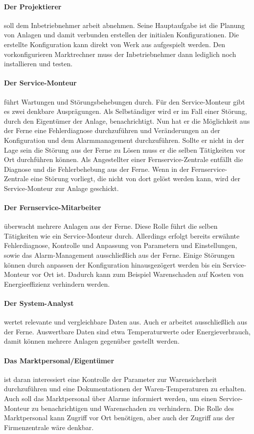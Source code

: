 \documentclass[11pt,a4paper]{report}
\begin{document}
\paragraph{Der Projektierer} soll dem Inbetriebnehmer arbeit abnehmen. Seine Hauptaufgabe ist die Planung von Anlagen und damit verbunden erstellen der initialen Konfigurationen. Die erstellte Konfiguration kann direkt von Werk aus aufgespielt werden. Den vorkonfigurieren Marktrechner muss der Inbetriebnehmer dann lediglich noch installieren und testen.
\paragraph{Der Service-Monteur} führt Wartungen und Störungsbehebungen durch. Für den Service-Monteur gibt es zwei denkbare Ausprägungen. Als Selbständiger wird er im Fall einer Störung, durch den Eigentümer der Anlage, benachrichtigt. Nun hat er die Möglichkeit aus der Ferne eine Fehlerdiagnose durchzuführen und Veränderungen an der Konfiguration und dem Alarmmanagement durchzuführen. Sollte er nicht in der Lage sein die Störung aus der Ferne zu Lösen muss er die selben Tätigkeiten vor Ort durchführen können. Als Angestellter einer Fernservice-Zentrale entfällt die Diagnose und die Fehlerbehebung aus der Ferne. Wenn in der Fernservice-Zentrale eine Störung vorliegt, die nicht von dort gelöst werden kann, wird der Service-Monteur zur Anlage geschickt.
\paragraph{Der Fernservice-Mitarbeiter} überwacht mehrere Anlagen aus der Ferne. Diese Rolle führt die selben Tätigkeiten wie ein Service-Monteur durch. Allerdings erfolgt bereits erwähnte Fehlerdiagnose, Kontrolle und Anpassung von Parametern und Einstellungen, sowie das Alarm-Management ausschließlich aus der Ferne. Einige Störungen können durch anpassen der Konfiguration hinausgezögert werden bis ein Service-Monteur vor Ort ist. Dadurch kann zum Beispiel Warenschaden auf Kosten von Energieeffizienz verhindern werden.
\paragraph{Der System-Analyst} wertet relevante und vergleichbare Daten aus. Auch er arbeitet ausschließlich aus der Ferne. Auswertbare Daten sind etwa Temperaturwerte oder Energieverbrauch, damit können mehrere Anlagen gegenüber gestellt werden. 
\paragraph{Das Marktpersonal/Eigentümer} ist daran interessiert eine Kontrolle der Parameter zur Warensicherheit durchzuführen und eine Dokumentationen der Waren-Temperaturen zu erhalten. Auch soll das Marktpersonal über Alarme informiert werden, um einen Service-Monteur zu benachrichtigen und Warenschaden zu verhindern. Die Rolle des Marktpersonal kann Zugriff vor Ort benötigen, aber auch der Zugriff aus der Firmenzentrale wäre denkbar.
\end{document}
